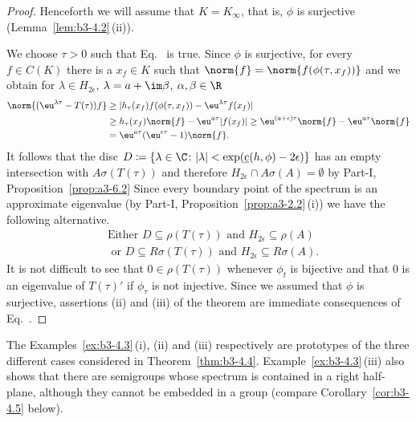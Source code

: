\begin{proof}
	Henceforth we will assume that $K = K_{\infty}$, that is, $\phi$ is surjective (\cf Lemma~\ref{lem:b3-4.2}\,(ii)).
	
	We choose $\tau > 0$ such that Eq.~ is true.
	Since $\phi$ is surjective, for every $f \in C(K)$ there is a $x_{f} \in K$ such that $\norm{f} = \norm{f(\phi(\tau,x_{f}))}$ and we obtain for $\lambda \in H_{2\epsilon}$, $\lambda = a + \im\beta$, $\alpha,\beta \in \R$
	\begin{equation}\label{eq:b3-4.9}
		\begin{aligned}
			\norm{(\eu^{\lambda\tau} - T(\tau))f} &\geq |h_{\tau}(x_{f})f(\phi(\tau,x_{f})) - \eu^{\lambda\tau}f(x_{f})| \\
			& \geq h_{\tau}(x_{f})\norm{f} - \eu^{a\tau}|f(x_{f})| 
			 \geq \eu^{(a+\epsilon)\tau}\norm{f} - \eu^{a\tau}\norm{f} \\
			&= \eu^{a\tau}(\eu^{\epsilon\tau} - 1)\norm{f}.
		\end{aligned}
	\end{equation}
	It follows that the disc $D \coloneq \{\lambda \in \C \colon |\lambda| < \exp(\underbar{c}(h,\phi)-2\epsilon)\}$ has an empty intersection with $A{\sigma}(T(\tau))$ and therefore $H_{2\epsilon}\cap A\sigma(A) = \emptyset$ by Part-I, Proposition~\ref{prop:a3-6.2}
	Since every boundary point of the spectrum is an approximate eigenvalue (by Part-I, Proposition~\ref{prop:a3-2.2}\,(i)) we have the following alternative.
	\begin{equation}\label{eq:b3-4.10}
		\begin{aligned}
		&\text{Either } D \subseteq \rho(T(\tau)) \text{ and } H_{2\epsilon} \subseteq \rho(A) \\
		&\text{ or } D \subseteq R{\sigma}(T(\tau)) \text{ and } H_{2\epsilon} \subseteq R{\sigma}(A).
	\end{aligned}
	\end{equation}
	It is not difficult to see that $0 \in \rho(T(\tau))$ whenever $\phi_{t}$ is bijective and that $0$ is an eigenvalue of\/ $T(\tau)'$ if\/ $\phi_{\tau}$ is not injective.
	Since we assumed that $\phi$ is surjective, assertions (ii) and (iii) of the theorem are immediate consequences of Eq.~.
\end{proof}
The Examples~\ref{ex:b3-4.3}\,(i), (ii) and (iii) respectively are prototypes of the three different cases considered in Theorem~\ref{thm:b3-4.4}.
Example~\ref{ex:b3-4.3}\,(iii) also shows that there are semigroups whose spectrum is contained in a right half-plane, although they cannot be embedded in a group (compare Corollary~\ref{cor:b3-4.5} below).
